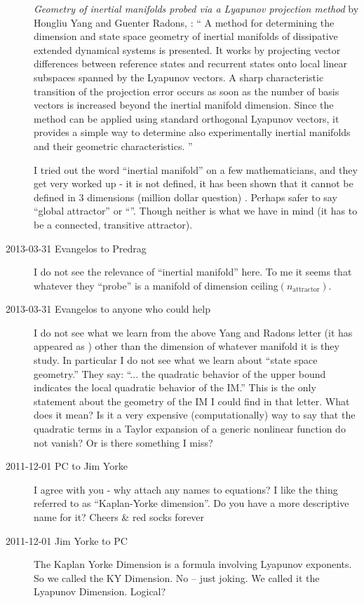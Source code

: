 \begin{description}
\emph{Geometry of inertial manifolds probed via a Lyapunov projection method}
by Hongliu Yang and Guenter Radons, :
``
A method for determining the dimension and state space geometry of
inertial manifolds of dissipative extended dynamical systems is
presented. It works by projecting vector differences between reference
states and recurrent states onto local linear subspaces spanned by the
Lyapunov vectors. A sharp characteristic transition of the projection
error occurs as soon as the number of basis vectors is increased beyond
the inertial manifold dimension. Since the method can be applied using
standard orthogonal Lyapunov vectors, it provides a simple way to
determine also experimentally inertial manifolds and their geometric
characteristics.
''

I tried out the word ``inertial manifold'' on a few mathematicians, and
they get very worked up - it is not defined, it has been shown that it
cannot be defined in 3 dimensions (million dollar question) \etc. Perhaps
safer to say ``global attractor'' or ``{\nws}''. Though neither is what
we have in mind (it has to be a connected, transitive attractor).

\item[2013-03-31 Evangelos to Predrag] I do not see the relevance of 
``inertial manifold'' here. To me it seems that whatever they ``probe'' is
a manifold of dimension ceiling$(n_{\mathrm{attractor}})$.

\item[2013-03-31 Evangelos to anyone who could help] 
I do not see what we learn from the above Yang and Radons
letter (it has appeared as ) other than the dimension of whatever
manifold it is they study. In particular I do not see what we learn about ``state space
geometry.'' They say: ``... the quadratic behavior of the upper bound 
indicates the local quadratic behavior of the IM.'' This is the only statement 
about the geometry of the IM I could find in that letter. What does it mean?
Is it a very expensive (computationally) way to say 
that the quadratic terms in a Taylor expansion of a generic nonlinear function
do not vanish? Or is there something I miss?

\item[2011-12-01 PC to Jim Yorke] I agree with you - why attach any names
to equations? I like the thing referred to as ``Kaplan-Yorke dimension''.
Do you have a more descriptive name for it?
Cheers \& red socks forever

\item[2011-12-01 Jim Yorke to PC] The Kaplan Yorke Dimension is a formula
involving Lyapunov exponents. So we called the KY Dimension. No -- just
joking. We called it the Lyapunov Dimension. Logical?


\end{description}
